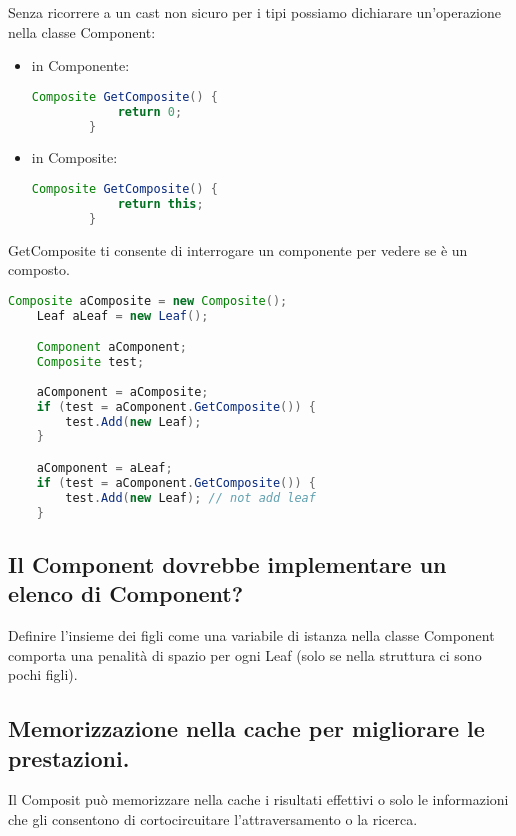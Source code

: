 Senza ricorrere a un cast non sicuro per i tipi possiamo dichiarare un'operazione nella classe Component:

\begin{itemize}
    \item in Componente:
    
    \begin{lstlisting}[language=java]
        Composite GetComposite() {
            return 0;
        }
    \end{lstlisting}

    \item in Composite:
    
    \begin{lstlisting}[language=java]
        Composite GetComposite() {
            return this;
        }
    \end{lstlisting}

\end{itemize}

GetComposite ti consente di interrogare un componente per vedere se è un composto.

\begin{lstlisting}[language=java]
    Composite aComposite = new Composite();
    Leaf aLeaf = new Leaf();

    Component aComponent;
    Composite test;
    
    aComponent = aComposite;
    if (test = aComponent.GetComposite()) {
        test.Add(new Leaf);
    }

    aComponent = aLeaf;
    if (test = aComponent.GetComposite()) {
        test.Add(new Leaf); // not add leaf
    }
\end{lstlisting}

\subsection{Il Component dovrebbe implementare un elenco di Component?}
Definire l'insieme dei figli come una variabile di istanza nella classe Component comporta una penalità di spazio per ogni Leaf (solo se nella struttura ci sono pochi figli).

\subsection{Memorizzazione nella cache per migliorare le prestazioni.}
Il Composit può memorizzare nella cache i risultati effettivi o solo le informazioni che gli consentono di cortocircuitare l'attraversamento o la ricerca. 

